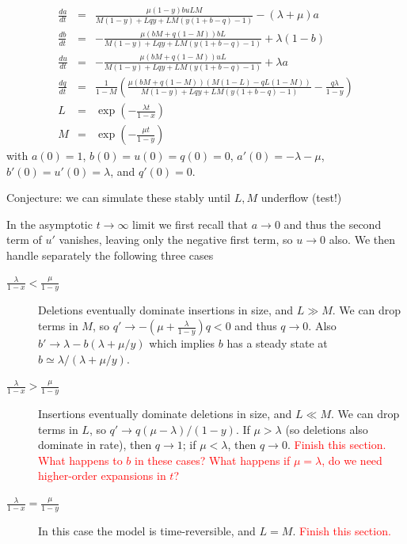 \documentclass{article}
\begin{document}
\begin{eqnarray*}
  \frac{da}{dt} & = & \frac{\mu (1-y) b u L M}{M (1 - y) + L q y + L M (y (1 + b - q) - 1)} - (\lambda +\mu ) a \\
  \frac{db}{dt} & = & -\frac{\mu (bM+q(1-M)) b L}{M (1 - y) + L q y + L M (y (1 + b - q) - 1)} + \lambda (1-b) \\
  \frac{du}{dt} & = & -\frac{\mu (bM+q(1-M)) u L}{M (1 - y) + L q y + L M (y (1 + b - q) - 1)} + \lambda a \\
  \frac{dq}{dt} & = & \frac{1}{1-M} \left( \frac{\mu (bM+q(1-M)) (M(1-L)-qL(1-M))}{M (1 - y) + L q y + L M (y (1 + b - q) - 1)} - \frac{q \lambda}{1-y} \right) \\
  L & = & \exp\left(-\frac{\lambda t}{1-x}\right) \\
  M & = & \exp\left(-\frac{\mu t}{1-y}\right)
\end{eqnarray*}
with $a(0)=1$, $b(0)=u(0)=q(0)=0$,
$a'(0)=-\lambda-\mu$, $b'(0)=u'(0)=\lambda$, and $q'(0)=0$.

Conjecture: we can simulate these stably until $L,M$ underflow (test!)

In the asymptotic $t \to \infty$ limit we first recall that $a \to 0$ and
thus the second term of $u'$ vanishes, leaving only the negative first term, so $u \to 0$ also.
We then handle separately the following three cases
\begin{description}
\item[$\frac{\lambda}{1-x} < \frac{\mu}{1-y}$]
  Deletions eventually dominate insertions in size, and $L \gg M$.
  We can drop terms in $M$, so $q' \to -(\mu+\frac{\lambda}{1-y})q < 0$ and thus $q \to 0$.
  Also $b' \to \lambda - b (\lambda + \mu / y)$ which implies $b$ has a steady state at $b \simeq \lambda / (\lambda + \mu / y)$.
\item[$\frac{\lambda}{1-x} > \frac{\mu}{1-y}$]
  Insertions eventually dominate deletions in size, and $L \ll M$.
  We can drop terms in $L$, so $q' \to q (\mu-\lambda)/(1-y)$.
  If $\mu > \lambda$ (so deletions also dominate in rate), then $q \to 1$; if $\mu < \lambda$, then $q \to 0$.
  \textcolor{red}{Finish this section. What happens to $b$ in these cases? What happens if $\mu = \lambda$, do we need higher-order expansions in $t$?}
\item[$\frac{\lambda}{1-x} = \frac{\mu}{1-y}$]
  In this case the model is time-reversible, and $L = M$.
  \textcolor{red}{Finish this section.}
\end{description}
\end{document}
